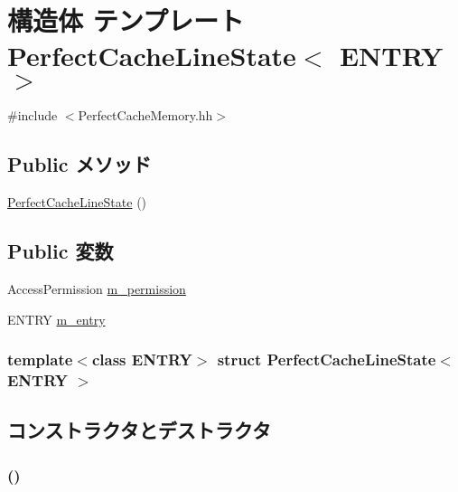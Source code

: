 \hypertarget{structPerfectCacheLineState}{
\section{構造体 テンプレート PerfectCacheLineState$<$ ENTRY $>$}
\label{structPerfectCacheLineState}
}


{\ttfamily \#include $<$PerfectCacheMemory.hh$>$}\subsection*{Public メソッド}
\begin{DoxyCompactItemize}
\item 
\hyperlink{structPerfectCacheLineState_af7845d74d71e7d56e6428e638dded765}{PerfectCacheLineState} ()
\end{DoxyCompactItemize}
\subsection*{Public 変数}
\begin{DoxyCompactItemize}
\item 
AccessPermission \hyperlink{structPerfectCacheLineState_a747d7ae3c3f18b09e5e8cd6414b1b9d4}{m\_\-permission}
\item 
ENTRY \hyperlink{structPerfectCacheLineState_ad2483e6aea81d69f15dbc409d0eed122}{m\_\-entry}
\end{DoxyCompactItemize}
\subsubsection*{template$<$class ENTRY$>$ struct PerfectCacheLineState$<$ ENTRY $>$}



\subsection{コンストラクタとデストラクタ}
\hypertarget{structPerfectCacheLineState_af7845d74d71e7d56e6428e638dded765}{
\subsubsection[{PerfectCacheLineState}]{ ()}}
\label{structPerfectCacheLineState_af7845d74d71e7d56e6428e638dded765}



